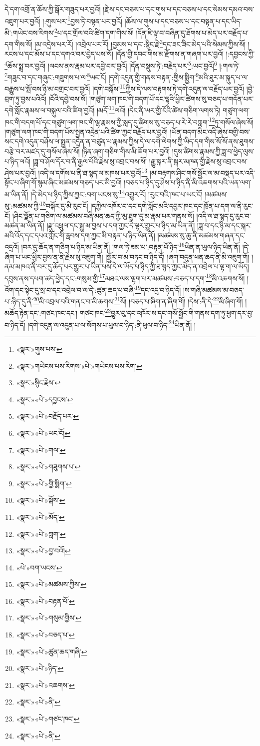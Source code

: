 དེ་དག་འགྲོ་ན་ཆོས་ཀྱི་སྒོར་གཟུད་པར་བྱའོ། །རྗེ་ས་དང་བཅས་པ་དང་གུས་པ་དང་བཅས་པ་དང་སེམས་དམའ་བས་འཇུག་པར་བྱའོ། །:གུས་པར་\footnote{«སྣར་»གུས་པས་}བྱས་ཏེ་བསྟན་པར་བྱའོ། །ཆོས་ལ་གུས་པ་དང་བཅས་པ་དང་བསྟན་པ་དང་ཡིད་མི་:གཡེང་བས་རིགས་\footnote{«སྣར་»གཡེངས་པས་རིགས་«པེ་»གཡེངས་པས་རིག་}པ་དང་གྲོལ་བའི་ཚིག་དག་གིས་སོ། །དོན་ཇི་ལྟ་བ་བཞིན་དུ་ཐོགས་པ་མེད་པར་བརྗོད་པ་དག་གིས་སོ། །མ་འདྲེས་པར་རོ། །འབྲེལ་པར་རོ། །བྱམས་པ་དང་:སྙིང་རྗེ་\footnote{«སྣར་»སྙིང་རྗེས་}དང་ཟང་ཟིང་མེད་པའི་སེམས་ཀྱིས་སོ། །རངས་པ་དང་མོས་པ་དང་དགའ་བར་བྱེད་པས་སོ། །དོན་གྱི་དབང་གིས་མ་རྫོགས་ན་གཞག་པར་བྱའོ། །:དབྱངས་ཀྱི་\footnote{«སྣར་»«པེ་»དབྱངས་}ཆོས་སྨྲ་བར་བྱའོ། །ལངས་ནས་རྣམ་པར་དབྱེ་བར་བྱའོ། །དོན་བསྡུས་ཏེ་:བརྗེད་པར་\footnote{«སྣར་»«པེ་»བརྗོད་པར་}:ཡང་བྱའོ།\footnote{«སྣར་»«པེ་»ཡང་ངོ།} །:གལ་ཏེ་\footnote{«སྣར་»«པེ་»གལ་}གཟུང་བ་དང་གཞུང་:གཟུགས་པ་ལ་\footnote{«སྣར་»«པེ་»གཟུགས་པ་}ཡང་ངོ། །དགེ་འདུན་གྱི་གནས་བརྟན་:གྱིས་སྨྱིག་\footnote{«སྣར་»«པེ་»གྱི་སྨིག་}མའི་ཐུར་མ་སྐུད་པ་ལ་བརྒྱུས་པ་སྤོ་བས་ཉི་མ་བགྲང་བར་བྱའོ། །དགེ་བསྐོས་\footnote{«སྣར་»«པེ་»སྐོས་}ཀྱིས་དེ་ལས་བརྟགས་ཏེ་དགེ་འདུན་ལ་བརྗོད་པར་བྱའོ། །བྱེ་བྲག་ཏུ་བྱས་པའིའོ། །ངོའི་དབྱེ་བས་སོ། །གཙུག་ལག་ཁང་གི་བདག་པོ་དང་ལྷའི་ཕྱིར་ཚིགས་སུ་བཅད་པ་གདོན་པར་དགེ་སློང་རྣམས་ལ་བསྐུལ་བའི་ཚིག་བྱའོ། །མདོ་\footnote{«སྣར་»«པེ་»མོད་}ལའོ། །དེང་ནི་ཡར་གྱི་ངོའི་ཚེས་གཅིག་ལགས་ཏེ། གཙུག་ལག་ཁང་གི་བདག་པོ་དང་གཙུག་ལག་ཁང་གི་ལྷ་རྣམས་ཀྱི་སླད་དུ་ཚིགས་སུ་བཅད་པ་རེ་རེ་བཀླག་\footnote{«སྣར་»«པེ་»ཀླག་}ཏུ་གསོལ་ཞེས་སོ། །གཙུག་ལག་ཁང་གི་བདག་པོས་སྤྱན་འདྲེན་པའི་ཚིག་ཀྱང་བརྗོད་པར་བྱའོ། །ཡོན་བདག་མིང་འདི་ཞེས་བགྱི་བས་སང་དགེ་འདུན་བཤོས་ལ་སྤྱན་འདྲེན་ན་བཙུན་པ་རྣམས་ཀྱིས་དེ་ལ་དགེ་ལེགས་ཀྱི་ཡིད་དག་གིས་སོ་སོ་ནས་ཐུགས་བརྩེ་བར་མཛད་དུ་གསོལ་ཞེས་སོ། །ཉིན་ཞག་གཅིག་གིས་མི་ཆོག་པར་བྱའོ། །དུས་ཚིགས་རྣམས་ཀྱི་ཟླ་བ་ཕྱེད་ལུས་པ་ཉིད་ལའོ། །ཟླ་བ་ཤོལ་དོར་བ་ནི་རྒྱལ་པོའི་རྗེས་སུ་འབྲང་བས་སོ། །རྒྱུ་སྐར་ནི་སྐར་མཁན་གྱི་རྗེས་སུ་འབྲང་བས་ཤེས་པར་བྱའོ། །འདི་ལ་དགོས་པ་ནི་ཐ་སྙད་ལ་མཁས་པར་བྱའོ།\footnote{«སྣར་»«པེ་»བྱ་བའོ།} །མ་བརྟགས་ཤིང་གསོ་སྦྱོང་ལ་མ་བསྡད་པར་འདི་སྟོང་པ་ཞིག་གོ་སྙམ་ཞིང་མཚམས་གཅད་པར་མི་བྱའོ། །བཅད་པ་ཉིད་དུ་ཤེས་པ་ཉིད་ནི་མི་འཆགས་པའི་ཡན་ལག་མ་ཡིན་ནོ། །དེ་མེད་པ་ཉིད་ཀྱིས་ཀྱང་:བག་ཡངས་སུ་\footnote{«པེ་»བག་ཡངས་}འགྱུར་རོ། །རུང་བའི་ཁང་པ་ཡང་ངོ། །མཚམས་སུ་:མཚམས་ཀྱི་\footnote{«སྣར་»«པེ་»མཚམས་ཀྱིས་}བསྐོར་དུ་མི་རུང་ངོ། །དཀྱིལ་འཁོར་བ་དང་དགེ་སློང་མའི་དབྱར་ཁང་དང་ཁྲོན་པ་དག་ལ་ནི་རུང་ངོ། །ཤིང་ལྗོན་པ་གཅིག་ལ་མཚམས་བཞི་མན་ཆད་ཀྱི་མུ་ཐུག་དུ་མ་རྣམ་པར་གནས་སོ། །འདི་ལ་ཐ་སྙད་དུ་རུང་བ་མཚན་མ་ཡིན་ནོ། །རྫུ་འཕྲུལ་དང་སྒྱུ་མ་བྱས་པ་དག་ཀྱང་དེ་ལྟར་གྱུར་པ་ཉིད་མ་ཡིན་ནོ། །ཟླ་བ་དང་ཉི་མ་དང་སྐར་མའི་འོད་དང་དཔའ་ཀློང་གི་རླབས་དག་ཀྱང་མི་བརྟན་པ་ཉིད་ཡིན་ནོ། །མཚམས་སུ་ཆུ་ནི་མཚམས་གཞན་དང་འདྲའོ། །བར་དུ་ཆོད་ན་གཅིག་པ་ཉིད་མ་ཡིན་ནོ། །གལ་ཏེ་ཟམ་པ་:བརྟན་པོ་ཉིད་\footnote{«སྣར་»«པེ་»བརྟན་པོ་}ཡིན་ན་ཡུལ་ཉིད་ཡིན་ནོ། །དེ་ཞིག་པ་ཡང་ཕྱིར་བྱས་ན་ནི་རྗེས་སུ་འཇུག་གོ། །སྦྱོར་བ་མ་བཏང་བ་ཉིད་དོ། །ཞག་བདུན་ཕན་ཆད་ནི་མི་འཇུག་གོ། །ནམ་མཁའ་ནི་བར་དུ་ཆོད་པར་གྱུར་པ་ཡིན་པས་དེ་ལ་ཡོད་པ་ཉིད་ཀྱི་ཐ་སྙད་ཀྱང་མེད་ན་འབྲེལ་པ་ལྟ་ག་ལ་ཡོད། དབུས་ནས་དཔག་ཚད་ཕྱེད་དང་:གསུམ་གྱི་\footnote{«སྣར་»«པེ་»གསུམ་གྱིས་}མཐའ་ལས་ལྷག་པར་མཚམས་:བཅད་པ་དག་\footnote{«སྣར་»«པེ་»བཅད་པ་}མི་འཆགས་སོ། །འོག་དང་སྟེང་དུ་སྲ་བ་དང་འབྲེལ་བ་ལ་དེ་:ཚུན་ཆད་པ་བཞི་\footnote{«སྣར་»«པེ་»ཚུན་ཆད་གཞི་}དང་འདྲ་བ་ཉིད་དོ། །ས་གཞི་མཚམས་མ་བཅད་པ་:ཉིད་དུ་ནི་\footnote{«སྣར་»«པེ་»ཉིད་}མི་འབྲལ་བའི་གནང་བ་མི་ཆགས་\footnote{«སྣར་»«པེ་»འཆགས་}སོ། །བཅད་པ་ཞིག་ན་ཞིག་གོ། །དེས་:ནི་དེ་\footnote{«སྣར་»«པེ་»ནི་}མི་ཞིག་གོ། །མཆོད་རྟེན་དང་:གཙང་ཁང་དང་། གཙང་ཁང་\footnote{«སྣར་»«པེ་»གཙང་ཁང་}བྱུར་བུ་དང་འཁོར་ས་དང་གསོ་སྦྱོང་གི་གནས་དག་ཏུ་ཕྱག་དར་བྱ་བ་ཉིད་དོ། །དགེ་འདུན་ལ་འདུན་པ་ལ་སོགས་པ་ཕུལ་བ་ཉིད་:ནི་ཕུལ་བ་ཉིད་\footnote{«སྣར་»«པེ་»ནི་}ཡིན་ནོ། །
